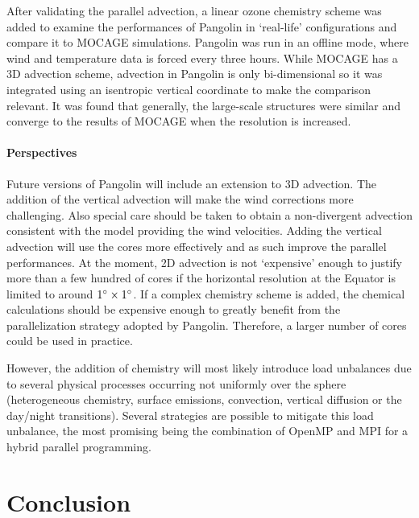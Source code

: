 After validating the parallel advection, a linear ozone chemistry scheme was
added to examine the performances of Pangolin in `real-life' configurations and
compare it to MOCAGE simulations. Pangolin was run in an offline mode, where
wind and temperature data is forced every three hours. While MOCAGE has a 3D
advection scheme, advection in Pangolin is only bi-dimensional so it was
integrated using an isentropic vertical coordinate to make the comparison
relevant. It was found that generally, the large-scale structures were similar
and converge to the results of MOCAGE when the resolution is increased.

\subsubsection*{Perspectives}
Future versions of Pangolin will include an extension to 3D advection. The
addition of the vertical advection will make the wind corrections more
challenging. Also special care should be taken to obtain a non-divergent
advection consistent with the model providing the wind velocities.  Adding the
vertical advection will use the cores more effectively and as such improve the
parallel performances. At the moment, 2D advection is not `expensive' enough to
justify more than a few hundred of cores if the horizontal resolution at the
Equator is limited to around $1^{\circ}\times1^{\circ}$. If a complex chemistry scheme is
added, the chemical calculations should be expensive enough to greatly benefit
from the parallelization strategy adopted by Pangolin. Therefore, a larger
number of cores could be used in practice.

However, the addition of chemistry will most likely introduce load unbalances
due to several physical processes occurring not uniformly over the sphere
(heterogeneous chemistry, surface emissions, convection, vertical diffusion or
the day/night transitions).  Several strategies are possible to mitigate this
load unbalance, the most promising being the combination of OpenMP and MPI for a
hybrid parallel programming.


%
\chapter*{Conclusion}

